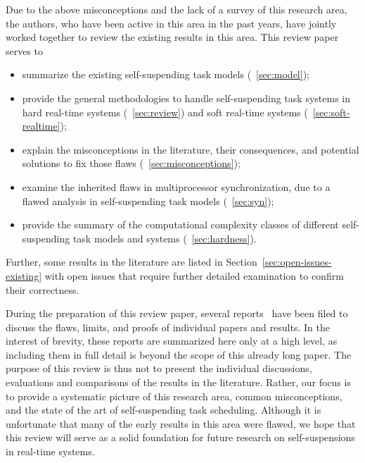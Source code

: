 \noindent Due to the above misconceptions and the lack of a survey of this research area, the authors, who have been active in this area in the past years, have jointly worked together to review the existing results in this area. This review paper serves to
\begin{itemize}
\item summarize the existing self-suspending task models (\mysectionref{}~\ref{sec:model}); 
\item provide the general methodologies to handle self-suspending task systems in hard real-time systems (\mysectionref{}~\ref{sec:review}) and soft real-time systems (\mysectionref{}~\ref{sec:soft-realtime});
\item explain the misconceptions in the literature, their consequences, and potential solutions to fix those flaws (\mysectionref{}~\ref{sec:misconceptions}); 
\item examine the inherited flaws in multiprocessor synchronization, due to a flawed analysis in self-suspending task models (\mysectionref{}~\ref{sec:syn});
\item provide the summary of the computational complexity classes of different self-suspending task models and systems (\mysectionref{}~\ref{sec:hardness}).
\end{itemize}
Further, some results in the literature are listed in Section~\ref{sec:open-issues-existing} with open issues that require further detailed examination to confirm their correctness. 

During the preparation of this review paper, several reports~ \cite{ChenHuangNelissen,ChenBrandenburg-2016-LITES,erratu-cong-anderson,BletsasReport2015}  have been filed to discuss the flaws, limits, and proofs of individual papers and results. In the interest of brevity, these reports are summarized here only at a high level, as including them in full detail is beyond the scope of this already long paper.
The purpose of this review is thus not to present the individual discussions, evaluations and comparisons of the results in the literature. Rather, our focus is to provide a systematic picture of this research area, common misconceptions, and the state of the art of self-suspending task scheduling. Although it is unfortunate that many of the early results in this area were flawed, we hope that this review will serve as a solid foundation for future research on self-suspensions in real-time systems.









    
  

    
  
